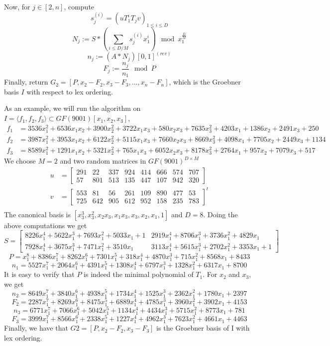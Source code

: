 \documentclass[12pt]{article}
\begin{document}
Now, for $j \in [2,n]$, compute 
$$s_j^{(i)} = (uT_1^i T_j v)_{1\le i \le D}$$
$$N_j := S*(\sum_{i\le D/M} s_j^{(i)} x_1^i) \mod x_1^{\frac{D}{M}}$$
$$n_j := (A*N_j)[0,1]^{(rev)}$$
$$F_j := \frac{n_j}{n_1} \mod P$$
Finally, return $G_2 = [P, x_2 - F_2, x_3 - F_3, \dots, x_n - F_n]$, which is the Groebner basis
$I$ with respect to lex ordering.

As an example, we will run the algorithm on $I = \langle f_1, f_2, f_3 \rangle \subset GF(9001)[x_1,x_2,x_3]$,
\begin{align*}
f_1 &= 3536x_1^2 +6536x_1x_2 + 3900x_2^2 + 3722x_1x_3 + 580x_2x_3 + 7635x_3^2 + 4203x_1 + 1386x_2 + 2491x_3 + 250\\
f_2 &= 3987x_1^2 + 3953x_1x_2 +6122x_2^2 +5115x_1x_3 +7660x_2x_3 +8669x_3^2 + 4098x_1 +7705x_2 + 2449x_3 + 1134\\
f_3 &= 8589x_1^2 + 1291x_1x_2 +5321x_2^2 + 765x_1x_3 +6052x_2x_3 +8178x_3^2 + 2764x_1 + 957x_2 +7079x_3 + 517
\end{align*}
We choose $M = 2$ and two random matrices in $GF(9001)^{D\times M}$
\begin{align*}
u &= \begin{bmatrix}
291&  22& 337& 924& 414& 666& 574& 707\\
57& 801& 513& 135& 447& 107& 942& 320
\end{bmatrix}\\
v &= \begin{bmatrix}
553&  81&  56& 261& 109& 890& 477&  53\\
725& 642& 905& 612& 952& 158& 235& 783
\end{bmatrix} ^ {t}\\
\end{align*}
The canonical basis is $[x_3^3, x_3^2, x_2x_3, x_1x_3, x_3, x_2, x_1, 1]$ and $D = 8$. Doing the above computations we get
$$S= \begin{bmatrix}
8226x_1^4 + 5622x_1^3 + 7693x_1^2 + 5033x_1 + 1&     2919x_1^4 + 8706x_1^3 + 3736x_1^2 + 4829x_1\\
7928x_1^4 + 3675x_1^3 + 7471x_1^2 + 3510x_1& 3113x_1^4 + 5615x_1^3 + 2702x_1^2 + 3353x_1 + 1
\end{bmatrix}$$
$$P =x_1^8 + 8386x_1^7 + 8262x_1^6 + 7301x_1^5 + 318x_1^4 + 4870x_1^3 + 715x_1^2 + 8568x_1 + 8433$$
$$n_1 = 5527x_1^7 + 2064x_1^6 + 4391x_1^5 + 1308x_1^4 + 6797x_1^3 + 1328x_1^2 + 6317x_1 + 8700$$
It is easy to verify that $P$ is indeed the minimal polynomial of $T_1$.
For $x_2$ and $x_3$, we get
$$n_2 = 8649x_1^7 + 3840x_1^6 + 4938x_1^5 + 1734x_1^4 + 1525x_1^3 + 2362x_1^2 + 1780x_1 + 2397$$
$$F_2 = 2287x_1^7 + 8269x_1^6 + 8475x_1^5 + 6889x_1^4 + 4785x_1^3 + 3960x_1^2 + 3902x_1 + 4153$$
$$n_3 = 6771x_1^7 + 7066x_1^6 + 5042x_1^5 + 1134x_1^4 + 4434x_1^3 + 5715x_1^2 + 8773x_1 + 781$$
$$F_3 = 3999x_1^7 + 8566x_1^6 + 2338x_1^5 + 1227x_1^4 + 4962x_1^3 + 7623x_1^2 + 4661x_1 + 4463$$
Finally, we have that $G2 = [P, x_2-F_2, x_3-F_3]$ is the Groebner basis of I with lex ordering.
\end{document}
